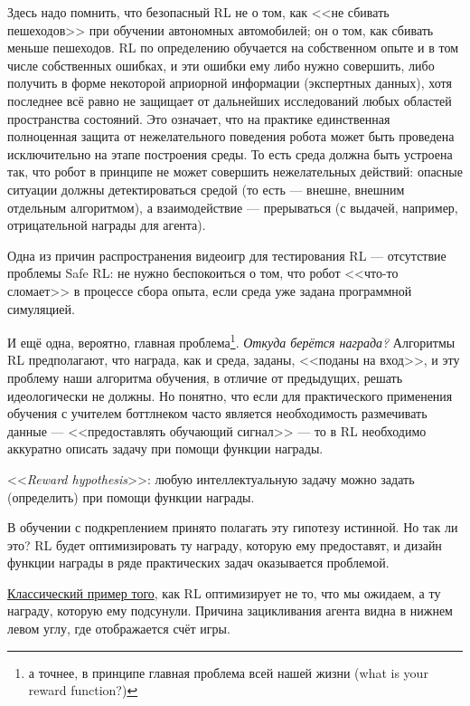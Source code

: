 \begin{remark}
Здесь надо помнить, что безопасный RL не о том, как <<не сбивать пешеходов>> при обучении автономных автомобилей; он о том, как сбивать меньше пешеходов. RL по определению обучается на собственном опыте и в том числе собственных ошибках, и эти ошибки ему либо нужно совершить, либо получить в форме некоторой априорной информации (экспертных данных), хотя последнее всё равно не защищает от дальнейших исследований любых областей пространства состояний. Это означает, что на практике единственная полноценная защита от нежелательного поведения робота может быть проведена исключительно на этапе построения среды. То есть среда должна быть устроена так, что робот в принципе не может совершить нежелательных действий: опасные ситуации должны детектироваться средой (то есть --- внешне, внешним отдельным алгоритмом), а взаимодействие --- прерываться (с выдачей, например, отрицательной награды для агента).
\end{remark}

\begin{remark}
Одна из причин распространения видеоигр для тестирования RL --- отсутствие проблемы Safe RL: не нужно беспокоиться о том, что робот <<что-то сломает>> в процессе сбора опыта, если среда уже задана программной симуляцией.
\end{remark}

И ещё одна, вероятно, главная проблема\footnote{а точнее, в принципе главная проблема всей нашей жизни (what is your reward function?)}. \emph{Откуда берётся награда?} Алгоритмы RL предполагают, что награда, как и среда, заданы, <<поданы на вход>>, и эту проблему наши алгоритма обучения, в отличие от предыдущих, решать идеологически не должны. Но понятно, что если для практического применения обучения с учителем боттлнеком часто является необходимость размечивать данные --- <<предоставлять обучающий сигнал>> --- то в RL необходимо аккуратно описать задачу при помощи функции награды.

\begin{definition}
<<\emph{Reward hypothesis}>>: любую интеллектуальную задачу можно задать (определить) при помощи функции награды.
\end{definition}

В обучении с подкреплением принято полагать эту гипотезу истинной. Но так ли это? RL будет оптимизировать ту награду, которую ему предоставят, и дизайн функции награды в ряде практических задач оказывается проблемой.

\begin{example}
\href{https://www.youtube.com/watch?v=tlOIHko8ySg}{Классический пример того}, как RL оптимизирует не то, что мы ожидаем, а ту награду, которую ему подсунули. Причина зацикливания агента видна в нижнем левом углу, где отображается счёт игры.
\end{example}

